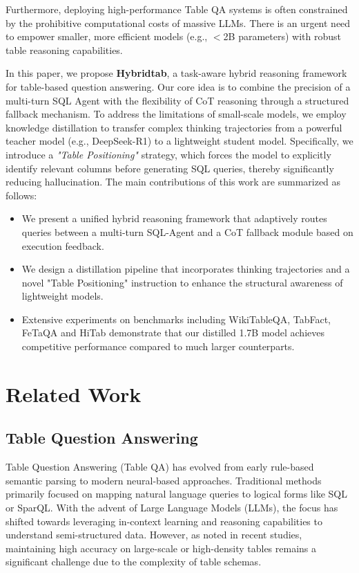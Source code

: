 \documentclass[11pt]{article}
\begin{document}
Furthermore, deploying high-performance Table QA systems is often constrained by the prohibitive computational costs of massive LLMs. There is an urgent need to empower smaller, more efficient models (e.g., $<$2B parameters) with robust table reasoning capabilities.

In this paper, we propose \textbf{Hybridtab}, a task-aware hybrid reasoning framework for table-based question answering. Our core idea is to combine the precision of a multi-turn SQL Agent with the flexibility of CoT reasoning through a structured fallback mechanism. To address the limitations of small-scale models, we employ knowledge distillation to transfer complex thinking trajectories from a powerful teacher model (e.g., DeepSeek-R1) to a lightweight student model. Specifically, we introduce a \textit{"Table Positioning"} strategy, which forces  the model to explicitly identify relevant columns before generating SQL queries, thereby significantly reducing hallucination.
The main contributions of this work are summarized as follows:
\begin{itemize}
    \item We present a unified hybrid reasoning framework that adaptively routes queries between a multi-turn SQL-Agent and a CoT fallback module based on execution feedback.
    \item We design a distillation pipeline that incorporates thinking trajectories and a novel "Table Positioning" instruction to enhance the structural awareness of lightweight models.
    \item Extensive experiments on benchmarks including WikiTableQA, TabFact, FeTaQA and HiTab demonstrate that our distilled 1.7B model achieves competitive performance compared to much larger counterparts.
\end{itemize}

\section{Related Work}

\subsection{Table Question Answering}
Table Question Answering (Table QA) has evolved from early rule-based semantic parsing to modern neural-based approaches. Traditional methods primarily focused on mapping natural language queries to logical forms like SQL or SparQL. With the advent of Large Language Models (LLMs), the focus has shifted towards leveraging in-context learning and reasoning capabilities to understand semi-structured data. However, as noted in recent studies, maintaining high accuracy on large-scale or high-density tables remains a significant challenge due to the complexity of table schemas.
\end{document}
